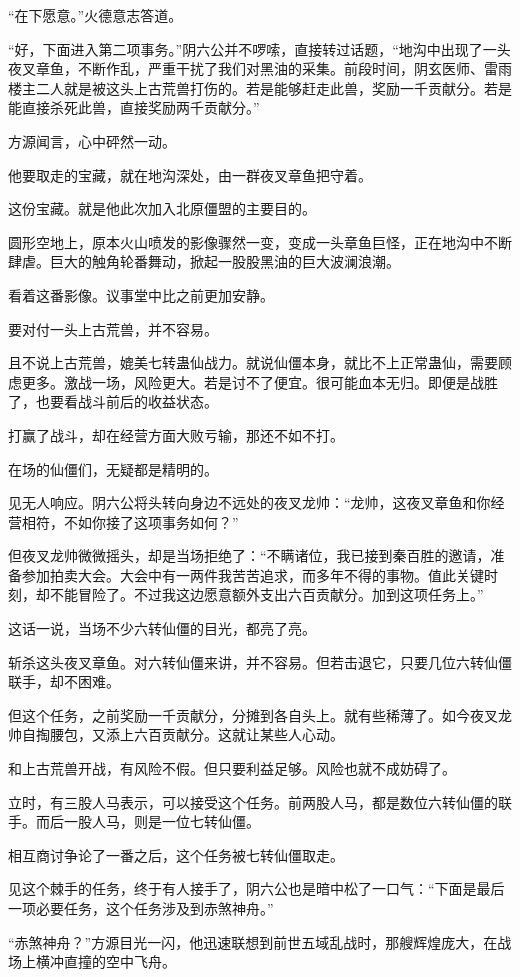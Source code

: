 \begin{this_body}
“在下愿意。”火德意志答道。

“好，下面进入第二项事务。”阴六公并不啰嗦，直接转过话题，“地沟中出现了一头夜叉章鱼，不断作乱，严重干扰了我们对黑油的采集。前段时间，阴玄医师、雷雨楼主二人就是被这头上古荒兽打伤的。若是能够赶走此兽，奖励一千贡献分。若是能直接杀死此兽，直接奖励两千贡献分。”

方源闻言，心中砰然一动。

他要取走的宝藏，就在地沟深处，由一群夜叉章鱼把守着。

这份宝藏。就是他此次加入北原僵盟的主要目的。

圆形空地上，原本火山喷发的影像骤然一变，变成一头章鱼巨怪，正在地沟中不断肆虐。巨大的触角轮番舞动，掀起一股股黑油的巨大波澜浪潮。

看着这番影像。议事堂中比之前更加安静。

要对付一头上古荒兽，并不容易。

且不说上古荒兽，媲美七转蛊仙战力。就说仙僵本身，就比不上正常蛊仙，需要顾虑更多。激战一场，风险更大。若是讨不了便宜。很可能血本无归。即便是战胜了，也要看战斗前后的收益状态。

打赢了战斗，却在经营方面大败亏输，那还不如不打。

在场的仙僵们，无疑都是精明的。

见无人响应。阴六公将头转向身边不远处的夜叉龙帅：“龙帅，这夜叉章鱼和你经营相符，不如你接了这项事务如何？”

但夜叉龙帅微微摇头，却是当场拒绝了：“不瞒诸位，我已接到秦百胜的邀请，准备参加拍卖大会。大会中有一两件我苦苦追求，而多年不得的事物。值此关键时刻，却不能冒险了。不过我这边愿意额外支出六百贡献分。加到这项任务上。”

这话一说，当场不少六转仙僵的目光，都亮了亮。

斩杀这头夜叉章鱼。对六转仙僵来讲，并不容易。但若击退它，只要几位六转仙僵联手，却不困难。

但这个任务，之前奖励一千贡献分，分摊到各自头上。就有些稀薄了。如今夜叉龙帅自掏腰包，又添上六百贡献分。这就让某些人心动。

和上古荒兽开战，有风险不假。但只要利益足够。风险也就不成妨碍了。

立时，有三股人马表示，可以接受这个任务。前两股人马，都是数位六转仙僵的联手。而后一股人马，则是一位七转仙僵。

相互商讨争论了一番之后，这个任务被七转仙僵取走。

见这个棘手的任务，终于有人接手了，阴六公也是暗中松了一口气：“下面是最后一项必要任务，这个任务涉及到赤煞神舟。”

“赤煞神舟？”方源目光一闪，他迅速联想到前世五域乱战时，那艘辉煌庞大，在战场上横冲直撞的空中飞舟。


\end{this_body}
